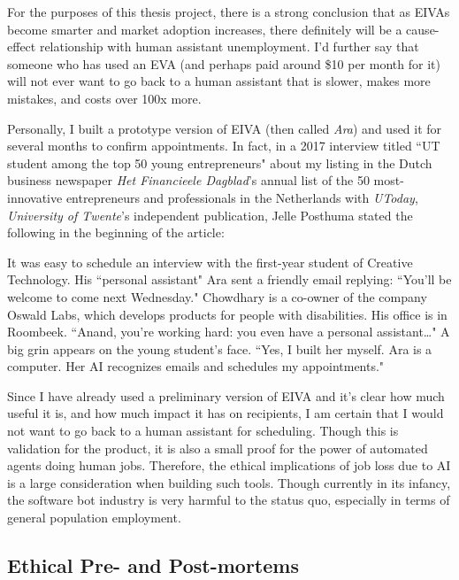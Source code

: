 \documentclass{article}
\begin{document}
For the purposes of this thesis project, there is a strong conclusion that as EIVAs become smarter and market adoption increases, there definitely will be a cause-effect relationship with human assistant unemployment. I'd further say that someone who has used an EVA (and perhaps paid around \$10 per month for it) will not ever want to go back to a human assistant that is slower, makes more mistakes, and costs over 100x more.

Personally, I built a prototype version of EIVA (then called \emph{Ara}) and used it for several months to confirm appointments. In fact, in a 2017 interview titled ``UT student among the top 50 young entrepreneurs" about my listing in the Dutch business newspaper \emph{Het Financieele Dagblad}'s annual list of the 50 most-innovative entrepreneurs and professionals in the Netherlands with \emph{UToday}, \emph{University of Twente}'s independent publication, Jelle Posthuma stated the following in the beginning of the article:

\begin{displayquote}
It was easy to schedule an interview with the first-year student of Creative Technology. His ``personal assistant" Ara sent a friendly email replying: ``You’ll be welcome to come next Wednesday." Chowdhary is a co-owner of the company Oswald Labs, which develops products for people with disabilities. His office is in Roombeek. ``Anand, you’re working hard: you even have a personal assistant…" A big grin appears on the young student’s face. ``Yes, I built her myself. Ara is a computer. Her AI recognizes emails and schedules my appointments."
\end{displayquote}

Since I have already used a preliminary version of EIVA and it's clear how much useful it is, and how much impact it has on recipients, I am certain that I would not want to go back to a human assistant for scheduling. Though this is validation for the product, it is also a small proof for the power of automated agents doing human jobs. Therefore, the ethical implications of job loss due to AI is a large consideration when building such tools. Though currently in its infancy, the software bot industry is very harmful to the status quo, especially in terms of general population employment.

\subsection{Ethical Pre- and Post-mortems}
\end{document}
